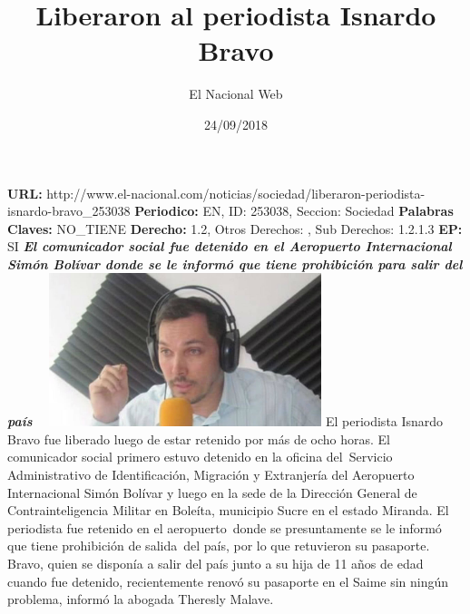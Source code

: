 \documentclass{article}%
\title{\textbf{Liberaron al periodista Isnardo Bravo}}%
\author{El Nacional Web}%
\date{24/09/2018}%
\begin{document}
%
\normalsize%
\maketitle%
\textbf{URL: }%
http://www.el{-}nacional.com/noticias/sociedad/liberaron{-}periodista{-}isnardo{-}bravo\_253038\newline%
%
\textbf{Periodico: }%
EN, %
ID: %
253038, %
Seccion: %
Sociedad\newline%
%
\textbf{Palabras Claves: }%
NO\_TIENE\newline%
%
\textbf{Derecho: }%
1.2, %
Otros Derechos: %
, %
Sub Derechos: %
1.2.1.3\newline%
%
\textbf{EP: }%
SI\newline%
\newline%
%
\textbf{\textit{El comunicador social fue detenido en el Aeropuerto Internacional Simón Bolívar donde se le informó que tiene prohibición para salir del país ~}}%
\newline%
\newline%
%
\includegraphics[width=300px]{163.jpg}%
\newline%
%
El periodista Isnardo Bravo fue liberado luego de estar retenido por más de ocho horas.%
\newline%
%
El comunicador social primero estuvo detenido en la oficina del~Servicio Administrativo de Identificación, Migración y Extranjería del Aeropuerto Internacional Simón Bolívar y luego en la sede de la Dirección General de Contrainteligencia Militar en Boleíta, municipio Sucre en el estado Miranda.%
\newline%
%
El periodista fue retenido en el aeropuerto~donde se presuntamente se le informó que tiene prohibición de salida~del país, por lo que retuvieron su pasaporte.%
\newline%
%
Bravo, quien se disponía a salir del país junto a su hija de 11 años de edad cuando fue detenido, recientemente renovó su pasaporte en el Saime sin ningún problema, informó la abogada Theresly Malave.%
\newline%
%
\end{document}
